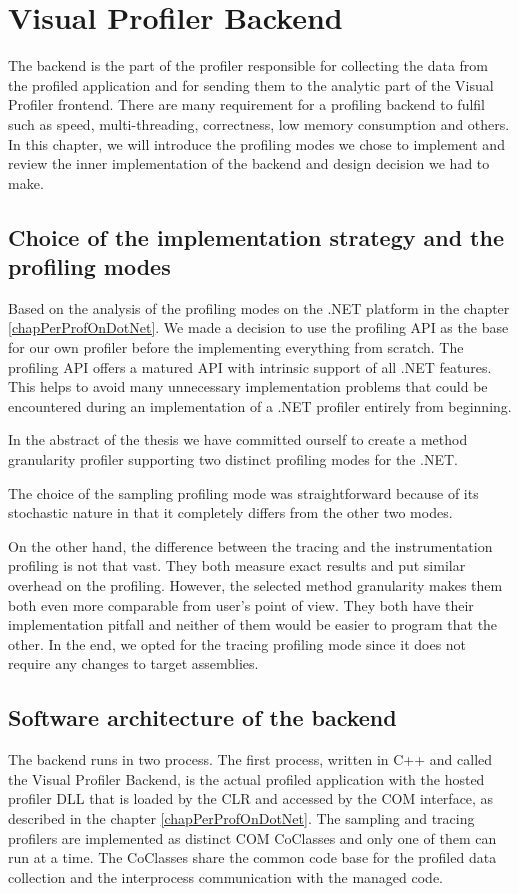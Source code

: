 \chapter{Visual Profiler Backend}
\label{chap04:chapter}
The backend is the part of the profiler responsible for collecting the data from the profiled application and for sending them to the analytic part of the Visual Profiler frontend. There are many requirement for a profiling backend to fulfil such as speed, multi-threading, correctness, low memory consumption and others. In this chapter, we will introduce the profiling modes we chose to implement and review the inner implementation of the backend and design decision we had to make.

\section{Choice of the implementation strategy and the profiling modes}
Based on the analysis of the profiling modes on the .NET platform in the chapter \ref{chapPerProfOnDotNet}. We made a decision to use the profiling API as the base for our own profiler before the implementing everything from scratch. The profiling API offers a 	 matured API with intrinsic support of all .NET features. This helps to avoid many unnecessary implementation problems that could be encountered during an implementation of a .NET profiler entirely from beginning.

In the abstract of the thesis we have committed ourself to create a method granularity profiler supporting two distinct profiling modes for the .NET.

The choice of the sampling profiling mode was straightforward because of its stochastic nature in that it completely differs from the other two modes. 

On the other hand, the difference between the tracing and the instrumentation profiling is not that vast. They both measure exact results and put similar overhead on the profiling. However, the selected method granularity makes them both even more comparable from user's point of view. They both have their implementation pitfall and neither of them would be easier to program that the other. In the end, we opted for the tracing profiling mode since it does not require any changes to target assemblies.

\section{Software architecture of the backend }
The backend runs in two process. The first process, written in C++ and called the Visual Profiler Backend, is the actual profiled application with the hosted profiler DLL that is loaded by the CLR and accessed by the COM interface, as described in the chapter \ref{chapPerProfOnDotNet}. The sampling and tracing profilers are implemented as distinct COM CoClasses and only one of them can run at a time. The CoClasses share the common code base for the profiled data collection and the interprocess communication with the managed code.

